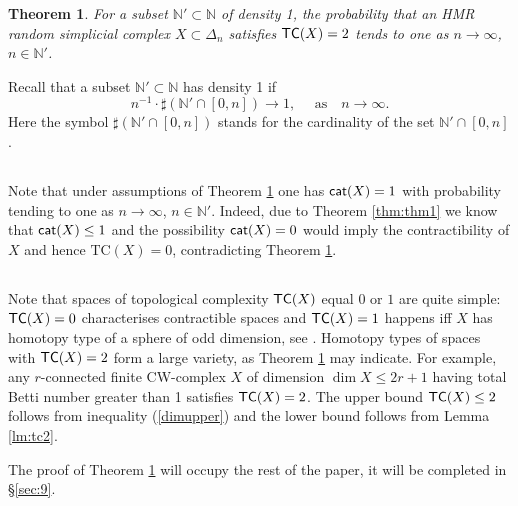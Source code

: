 \documentclass[10pt,a4paper]{amsart}
\newtheorem{teo}[lema]{Theorem}
\newcommand{\N}{\mathbb{N}}
\newcommand{\TC}{\textrm{TC}}
\newcommand{\cat}{{\sf{cat}}}
\newcommand{\tc}{{\sf{TC}}}
\begin{document}
\begin{teo}\label{thm:tc2}
For a subset $\N'\subset \N$ of density 1, the probability that an HMR random simplicial complex $X\subset \Delta_n$ satisfies $\tc(X)=2$ tends to one as $n\to \infty$, $n\in \N'$. 
\end{teo} 

Recall that a subset $\N'\subset \N$ has density 1 if $$n^{-1}\cdot \sharp(\N'\cap [0,n])\to 1, \quad \mbox{ as}\quad  n\to \infty.$$ 
Here the symbol $\sharp(\N'\cap [0,n])$ stands for the cardinality of the set $\N'\cap [0,n]$. 

\subsection{} Note that under assumptions of Theorem \ref{thm:tc2} one has $\cat(X)=1$ with probability tending to one as $n\to \infty$, $n\in \N'$. Indeed, due to Theorem 
\ref{thm:thm1} we know that $\cat(X)\le 1$ and the possibility $\cat(X)=0$ would imply the contractibility of  $X$ and hence $\TC(X)=0$, 
 contradicting Theorem \ref{thm:tc2}. 
 
 \subsection{} Note that spaces of topological complexity $\tc(X)$ equal $0$ or $1$ are quite simple: $\tc(X)=0$ characterises contractible spaces and $\tc(X)=1$ happens iff $X$ has homotopy type of a sphere of odd dimension, see \cite{GLO}. 
 Homotopy types of spaces with $\tc(X)=2$ form a large variety, as Theorem \ref{thm:tc2} may indicate. For example, any $r$-connected 
 finite CW-complex $X$ of dimension $\dim X\le 2r+1$ having total Betti number greater than 1 satisfies $\tc(X)=2$. The upper bound $\tc(X)\le 2$ follows from inequality (\ref{dimupper}) and the lower bound follows from Lemma \ref{lm:tc2}. 

The proof of Theorem \ref{thm:tc2} will occupy the rest of the paper, it will be completed in \S \ref{sec:9}. 


\end{document}
